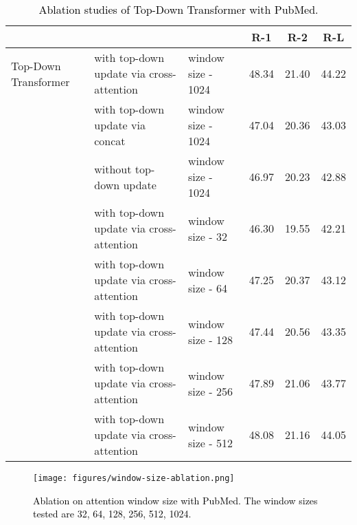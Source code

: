 \begin{table}[!htbp]
\small
\centering
\begin{tabular}{l l l c c c} 
\toprule
& & & R-1 & R-2 & R-L \\
\hline
Top-Down Transformer & with top-down update via cross-attention & window size - 1024 & 48.34 & 21.40 & 44.22 \\ 
& with top-down update via concat  & window size - 1024 & 47.04 & 20.36 & 43.03 \\ 
& without top-down update & window size - 1024 & 46.97 & 20.23 & 42.88 \\ 
\hline
& with top-down update via cross-attention & window size - 32 & 46.30 & 19.55 & 42.21 \\ 
& with top-down update via cross-attention & window size - 64  & 47.25 & 20.37 & 43.12 \\ 
& with top-down update via cross-attention & window size - 128  & 47.44 & 20.56 & 43.35 \\ 
& with top-down update via cross-attention & window size - 256  & 47.89 & 21.06 & 43.77 \\ 
& with top-down update via cross-attention & window size - 512  & 48.08 & 21.16 & 44.05 \\ 
\hline
\end{tabular}
\caption{\textcolor{black}{Ablation studies of Top-Down Transformer with PubMed.}}
\label{table:ablation-all}
\end{table}

\begin{figure}[!htbp]
    \centering
    \texttt{[image: figures/window-size-ablation.png]}
    \caption{\footnotesize \textcolor{black}{Ablation on attention window size with PubMed. The window sizes tested are 32, 64, 128, 256, 512, 1024.} }
    \label{fig:ablation-window}
\end{figure}


